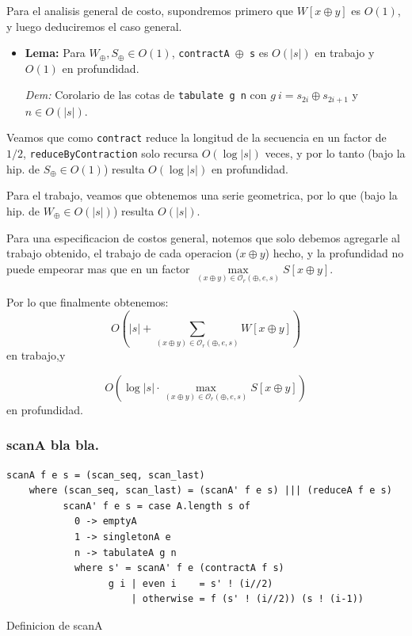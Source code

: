 \documentclass[12pt]{article}
\begin{document}
Para el analisis general de costo, supondremos primero que $W[x \oplus y]$ es $O(1)$, y luego deduciremos el caso general.

\begin{itemize}
\item \textbf{Lema:} Para $W_\oplus,S_\oplus \in O(1)$, \texttt{contractA $\oplus$ s} es $O(|s|)$ en trabajo y $O(1)$ en profundidad.

 \textit{Dem:} Corolario de las cotas de \texttt{tabulate g n} con $g\ i = s_{2i}\oplus s_{2i+1}$ y $n\in O(|s|)$.
\end{itemize}

Veamos que como \texttt{contract} reduce la longitud de la secuencia en un factor de $1/2$, \texttt{reduceByContraction} solo recursa $O(\log |s|)$ veces, y por lo tanto (bajo la hip. de $S_\oplus \in O(1)$) resulta $O(\log |s|)$ en profundidad.

Para el trabajo, veamos que obtenemos una serie geometrica, por lo que (bajo la hip. de $W_\oplus \in O(|s|)$) resulta $O(|s|)$.

Para una especificacion de costos general, notemos que solo debemos agregarle al trabajo obtenido, el trabajo de cada operacion ($x\oplus y$) hecho, y la profundidad no puede empeorar mas que en un factor $\max\limits_{(x\oplus y)\in\mathcal{O}_r(\oplus,e,s)} S[x\oplus y]$.

Por lo que finalmente obtenemos:
$$O(|s| + \sum\limits_{(x\oplus y)\in\mathcal{O}_r(\oplus,e,s)} W[x\oplus y])$$ en trabajo,y

$$ O(\log |s|\cdot \max\limits_{(x\oplus y)\in\mathcal{O}_r(\oplus,e,s)} S[x\oplus y])$$ en profundidad.

\subsubsection{scanA bla bla.}



\begin{table}[h]
\begin{lstlisting}
scanA f e s = (scan_seq, scan_last)
    where (scan_seq, scan_last) = (scanA' f e s) ||| (reduceA f e s)
          scanA' f e s = case A.length s of
            0 -> emptyA
            1 -> singletonA e
            n -> tabulateA g n
            where s' = scanA' f e (contractA f s)
                  g i | even i    = s' ! (i//2)
                      | otherwise = f (s' ! (i//2)) (s ! (i-1))
\end{lstlisting}
\caption{Definicion de scanA}
\end{table}
\end{document}
